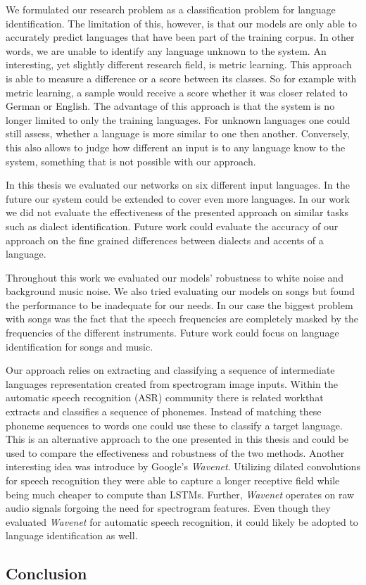 We formulated our research problem as a classification problem for language identification. The limitation of this, however, is that our models are only able to accurately predict languages that have been part of the training corpus. In other words, we are unable to identify any language unknown to the system. An interesting, yet slightly different research field, is metric learning. This approach is able to measure a difference or a score between its classes. So for example with metric learning, a sample would receive a score whether it was closer related to German or English. The advantage of this approach is that the system is no longer limited to only the training languages. For unknown languages one could still assess, whether a language is more similar to one then another. Conversely, this also allows to judge how different an input is to any language know to the system, something that is not possible with our approach.

In this thesis we evaluated our networks on six different input languages. In the future our system could be extended to cover even more languages. In our work we did not evaluate the effectiveness of the presented approach on similar tasks such as dialect identification. Future work could evaluate the accuracy of our approach on the fine grained differences between dialects and accents of a language.

Throughout this work we evaluated our models' robustness to white noise and background music noise. We also tried evaluating our models on songs but found the performance to be inadequate for our needs. In our case the biggest problem with songs was the fact that the speech frequencies are completely masked by the frequencies of the different instruments. Future work could focus on language identification for songs and music.

Our approach relies on extracting and classifying a sequence of intermediate languages representation created from spectrogram image inputs. Within the automatic speech recognition (ASR) community there is related work\cite{song2015end}that extracts and classifies a sequence of phonemes. Instead of matching these phoneme sequences to words one could use these to classify a target language. This is an alternative approach to the one presented in this thesis and could be used to compare the effectiveness and robustness of the two methods. Another interesting idea was introduce by Google's \emph{Wavenet}\cite{van2016wavenet}. Utilizing dilated convolutions for speech recognition they were able to capture a longer receptive field while being much cheaper to compute than LSTMs. Further, \emph{Wavenet} operates on raw audio signals forgoing the need for spectrogram features.  Even though they evaluated \emph{Wavenet} for automatic speech recognition, it could likely be adopted to language identification as well. 

\subsection{Conclusion}